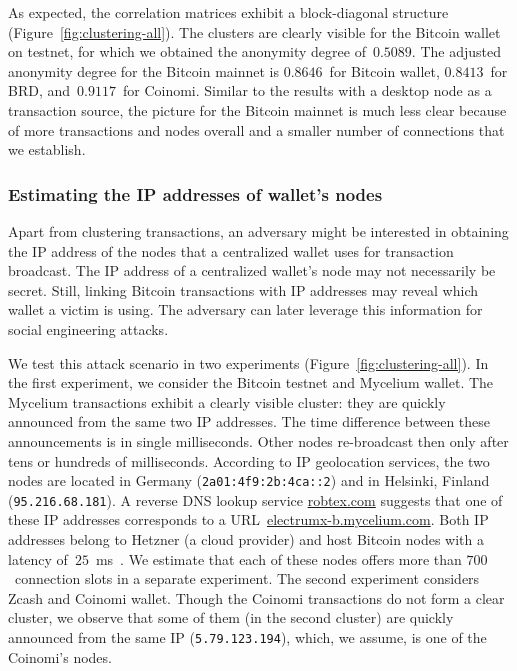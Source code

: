 As expected, the correlation matrices exhibit a block-diagonal structure (Figure~\ref{fig:clustering-all}).
The clusters are clearly visible for the Bitcoin wallet on testnet, for which we obtained the anonymity degree of~$0.5089$.
The adjusted anonymity degree for the Bitcoin mainnet is $0.8646$~for Bitcoin wallet, $0.8413$~for BRD, and~$0.9117$~for Coinomi.
Similar to the results with a desktop node as a transaction source, the picture for the Bitcoin mainnet is much less clear because of more transactions and nodes overall and a smaller number of connections that we establish.


\subsubsection*{Estimating the IP addresses of wallet's nodes}

Apart from clustering transactions, an adversary might be interested in obtaining the IP address of the nodes that a centralized wallet uses for transaction broadcast.
The IP address of a centralized wallet's node may not necessarily be secret.
Still, linking Bitcoin transactions with IP addresses may reveal which wallet a victim is using.
The adversary can later leverage this information for social engineering attacks.

We test this attack scenario in two experiments (Figure~\ref{fig:clustering-all}).
In the first experiment, we consider the Bitcoin testnet and Mycelium wallet.
The Mycelium transactions exhibit a clearly visible cluster: they are quickly announced from the same two IP addresses.
The time difference between these announcements is in single milliseconds.
Other nodes re-broadcast then only after tens or hundreds of milliseconds.
According to IP geolocation services, the two nodes are located in Germany (\texttt{2a01:4f9:2b:4ca::2}) and in Helsinki, Finland (\texttt{95.216.68.181}).
A reverse DNS lookup service \url{robtex.com} suggests that one of these IP addresses corresponds to a URL~\url{electrumx-b.mycelium.com}.
Both IP addresses belong to Hetzner (a cloud provider) and host Bitcoin nodes with a latency of~$25$~ms~\cite{Bitnodes}.
We estimate that each of these nodes offers more than $700$~connection slots in a separate experiment.
The second experiment considers Zcash and Coinomi wallet.
Though the Coinomi transactions do not form a clear cluster, we observe that some of them (in the second cluster) are quickly announced from the same IP (\texttt{5.79.123.194}), which, we assume, is one of the Coinomi's nodes.


